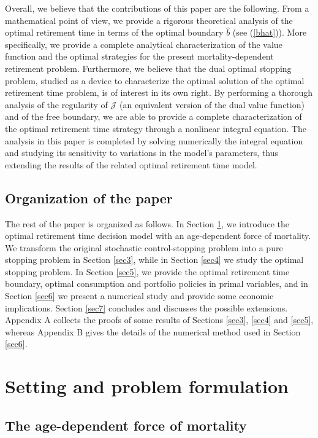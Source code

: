 \documentclass[a4paper,11pt]{amsart}
\numberwithin{equation}{section}
\begin{document}
Overall, we believe that the contributions of this paper are the following. From a mathematical point of view, we provide a rigorous theoretical analysis of the optimal retirement time in terms of the optimal boundary $\widehat{b}$ (see (\ref{bhat})). {More specifically, we provide a complete analytical characterization of the value function and the optimal strategies for the present mortality-dependent retirement problem.} Furthermore, we believe that the dual optimal stopping problem, studied as a device to characterize the optimal solution of the optimal retirement time problem, is of interest {in its own right}. By performing a thorough analysis {of} the regularity of $\mathcal{J}$ (an equivalent version of the dual value function) and of the free boundary, we are able to provide a complete characterization of the optimal retirement time strategy through a nonlinear integral equation. The analysis in this paper is completed by solving numerically the integral equation and studying its sensitivity to variations in the model's parameters, thus extending the results of the related optimal retirement time model.
\vspace{-0.5\baselineskip}

\subsection{Organization of the paper}
The rest of the paper is organized as follows. In Section \ref{sec2}, we introduce the optimal retirement time decision model with an age-dependent force of mortality. We transform the original stochastic control-stopping problem into a pure stopping problem in Section \ref{sec3}, while in Section \ref{sec4} we study the optimal stopping problem. In Section \ref{sec5}, we provide the optimal retirement time boundary, {optimal consumption and portfolio policies} in primal variables, and in Section \ref{sec6} we present a numerical study and provide some economic implications. {Section \ref{sec7} concludes and discusses the possible extensions.} Appendix A collects the proofs of some results of Sections \ref{sec3}, \ref{sec4} and \ref{sec5}, whereas Appendix B gives the details of the numerical method used in Section \ref{sec6}.


\section{Setting and problem formulation}\label{sec2}
\subsection{The age-dependent force of mortality}
\end{document}
